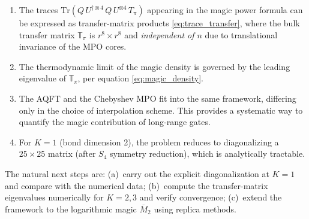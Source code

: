 \documentclass[11pt,a4paper]{article}
\theoremstyle{definition}
\theoremstyle{remark}
\newcommand{\Mtwo}{\overline{M}_2}
\renewcommand{\Tr}{\mathrm{Tr}}
\begin{document}
\begin{enumerate}[label=(\roman*)]
  \item The traces $\Tr(Q\,U^{\dagger\otimes 4}\,Q\,U^{\otimes 4}\,T_\pi)$ appearing in the magic power formula can be expressed as transfer-matrix products \eqref{eq:trace_transfer}, where the bulk transfer matrix $\mathbb{T}_\pi$ is $r^8\times r^8$ and \emph{independent of $n$} due to translational invariance of the MPO cores.

  \item The thermodynamic limit of the magic density is governed by the leading eigenvalue of $\mathbb{T}_\pi$, per equation \eqref{eq:magic_density}.

  \item The AQFT and the Chebyshev MPO fit into the same framework, differing only in the choice of interpolation scheme.  This provides a systematic way to quantify the magic contribution of long-range gates.

  \item For $K=1$ (bond dimension 2), the problem reduces to diagonalizing a $25\times 25$ matrix (after $S_4$ symmetry reduction), which is analytically tractable.
\end{enumerate}

The natural next steps are: (a)~carry out the explicit diagonalization at $K=1$ and compare with the numerical data; (b)~compute the transfer-matrix eigenvalues numerically for $K=2,3$ and verify convergence; (c)~extend the framework to the logarithmic magic $\Mtwo$ using replica methods.
\end{document}
